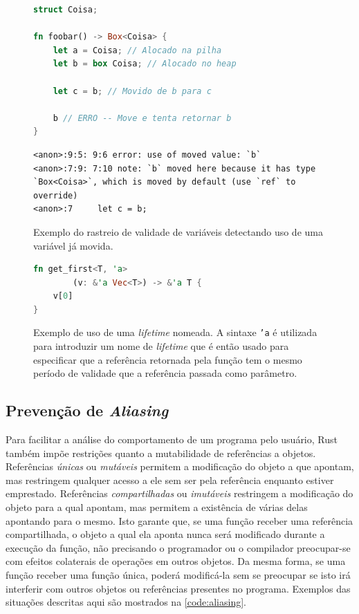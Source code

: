 \documentclass[tg]{mdtufsm}
\begin{document}
\begin{figure}
	\centering
	\begin{minipage}[c]{0.45\textwidth}
		\begin{lstlisting}[language=Rust]
struct Coisa;

fn foobar() -> Box<Coisa> {
	let a = Coisa; // Alocado na pilha
	let b = box Coisa; // Alocado no heap

	let c = b; // Movido de b para c

	b // ERRO -- Move e tenta retornar b
}
		\end{lstlisting}
		\begin{lstlisting}[numbers=none, breaklines=true]
<anon>:9:5: 9:6 error: use of moved value: `b`
<anon>:7:9: 7:10 note: `b` moved here because it has type `Box<Coisa>`, which is moved by default (use `ref` to override)
<anon>:7     let c = b;
		\end{lstlisting}
		\caption{
			Exemplo do rastreio de validade de variáveis detectando uso de uma variável já movida.
		}
		\label{code:moving-vars}
	\end{minipage}%
	\hspace{2em}%
	\begin{minipage}[c]{0.45\textwidth}
		\begin{lstlisting}[language=Rust]
fn get_first<T, 'a>
		(v: &'a Vec<T>) -> &'a T {
	v[0]
}
		\end{lstlisting}
		\caption[Exemplo de uso de uma \emph{lifetime} nomeada.]{
			Exemplo de uso de uma \emph{lifetime} nomeada. A sintaxe \texttt{'a} é utilizada para introduzir um nome de \emph{lifetime} que é então usado para especificar que a referência retornada pela função tem o mesmo período de validade que a referência passada como parâmetro.
		}
		\label{code:named-lifetime}
	\end{minipage}
\end{figure}

\subsection{Prevenção de \emph{Aliasing}} \label{sect:aliasing}

Para facilitar a análise do comportamento de um programa pelo usuário, Rust também impõe restrições quanto a mutabilidade de referências a objetos. Referências \emph{únicas} ou \emph{mutáveis} permitem a modificação do objeto a que apontam, mas restringem qualquer acesso a ele sem ser pela referência enquanto estiver emprestado. Referências \emph{compartilhadas} ou \emph{imutáveis} restringem a modificação do objeto para a qual apontam, mas permitem a existência de várias delas apontando para o mesmo. Isto garante que, se uma função receber uma referência compartilhada, o objeto a qual ela aponta nunca será modificado durante a execução da função, não precisando o programador ou o compilador preocupar-se com efeitos colaterais de operações em outros objetos. Da mesma forma, se uma função receber uma função única, poderá modificá-la sem se preocupar se isto irá interferir com outros objetos ou referências presentes no programa. Exemplos das situações descritas aqui são mostrados na \autoref{code:aliasing}.
\end{document}
